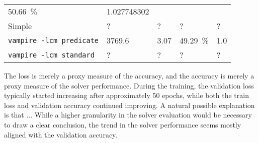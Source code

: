 \begin{table*}[h]
\begin{tabular}{l|ll|ll}
\SI{50.66}{\percent} &

\num[round-mode=places,round-precision=3]{1.027748302} \\


Simple & ? & ? & ? & ? \\


\texttt{vampire -lcm predicate} &

\num{3769.6} &

\num{3.07} &

\SI{49.29}{\percent} &

\num[round-mode=places,round-precision=3]{1.0} \\


\texttt{vampire -lcm standard} & ? & ? & ? & ? \\

\end{tabular}
\end{table*}


The loss is merely a proxy measure of the accuracy,
and the accuracy is merely a proxy measure of the solver performance.
During the training, the validation loss typically started increasing after approximately 50 epochs,
while both the train loss and validation accuracy continued improving.
A natural possible explanation is that ...
While a higher granularity in the solver evaluation would be necessary to draw a clear conclusion,
the trend in the solver performance seems mostly aligned with the validation accuracy.

